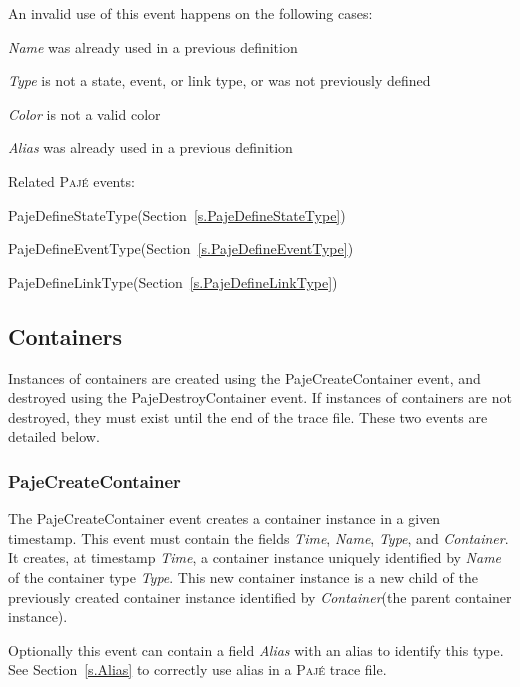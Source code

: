 \documentclass[12pt]{article}
\newcommand{\Paje}{\textsc{Paj\'e}\xspace}
\newcommand{\PajeField}[1]{\emph{#1}\xspace}
\newcommand{\Time}{\PajeField{Time}}
\newcommand{\Name}{\PajeField{Name}}
\newcommand{\Type}{\PajeField{Type}}
\newcommand{\Container}{\PajeField{Container}}
\newcommand{\Alias}{\PajeField{Alias}}
\newcommand{\Color}{\PajeField{Color}}
\newcommand{\PajeEvent}[1]{\textsf{#1}\xspace}
\newcommand{\PajeDefineStateType}{\PajeEvent{PajeDefineStateType}}
\newcommand{\PajeDefineEventType}{\PajeEvent{PajeDefineEventType}}
\newcommand{\PajeDefineLinkType}{\PajeEvent{PajeDefineLinkType}}
\newcommand{\PajeCreateContainer}{\PajeEvent{PajeCreateContainer}}
\newcommand{\PajeDestroyContainer}{\PajeEvent{PajeDestroyContainer}}
\newenvironment{itemize*}%
               {\vspace{-1em}
                 \begin{itemize}%
                   \setlength{\itemsep}{0pt}%
                   \setlength{\parskip}{0pt}}%
               {\end{itemize}}
\begin{document}
An invalid use of this event happens on the following cases:
\begin{itemize*}
\item \Name was already used in a previous definition
\item \Type is not a state, event, or link type, or was not previously defined
\item \Color is not a valid color
\item \Alias was already used in a previous definition
\end{itemize*}

Related \Paje events:
\begin{itemize*}
\item \PajeDefineStateType (Section~\ref{s.PajeDefineStateType})
\item \PajeDefineEventType (Section~\ref{s.PajeDefineEventType})
\item \PajeDefineLinkType (Section~\ref{s.PajeDefineLinkType})
\end{itemize*}

\subsection{Containers}
Instances of containers are created using the \PajeCreateContainer
event, and destroyed using the \PajeDestroyContainer event. If
instances of containers are not destroyed, they must exist until the
end of the trace file. These two events are detailed below.

\subsubsection{PajeCreateContainer}
\label{s.PajeCreateContainer}
The \PajeCreateContainer event creates a container instance in a given
timestamp. This event must contain the fields \Time, \Name, \Type, and
\Container. It creates, at timestamp \Time, a container instance
uniquely identified by \Name of the container type \Type. This new
container instance is a new child of the previously created container
instance identified by \Container (the parent container instance).

Optionally this event can contain a field \Alias with an alias to
identify this type. See Section~\ref{s.Alias} to correctly use alias
in a \Paje trace file.
\end{document}
